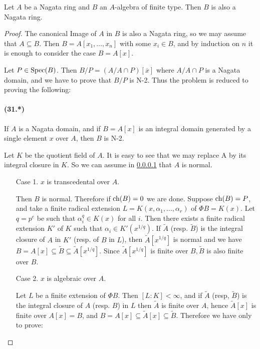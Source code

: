 \documentclass[../main]{subfiles}
\begin{document}
\begin{partheorem}[Nagata]\label{thm:072}
Let $A$ be a Nagata ring and $B$ an $A$-algebra of finite type. Then $B$ is also a Nagata ring.
\end{partheorem} 
\begin{proof}
The canonical Image of $A$ in $B$ is also a Nagata ring, so we may assume that $A \subseteq B$. Then $B=A[x_{1}, \ldots, x_{n}]$ with some $x_{i} \in B$, and by induction on $n$ it is enough to consider the case $B=A[x]$.


Let $P \in \operatorname{Spec}(B)$. Then $B / P=(A / A \cap P)[\overline{x}]$ where $A / A \cap P$ is a Nagata domain, and we have to prove that $B / P$ is N-2.
Thus the problem is reduced to proving the following:

\paragraph{(31.*)}\label{31.*} If $A$ is a Nagata domain, and if $B=A[x]$ is an integral domain generated by a single element $x$ over $A$, then $B$ is N-2.

Let $K$ be the quotient field of $A$. It is easy to see that we may replace A by its integral closure in $K$. So we can assume in \ref{31.*} that $A$ is normal.
\begin{enumerate}
    \item[Case 1.] $x$ is transcedental over $A$.

Then $B$ is normal. Therefore if $\operatorname{ch}(B)=0$ we are done.
Suppose $\operatorname{ch}(B)=P$, and take a finite radical extension $L= K(x, \alpha_{1}, \ldots, \alpha_{r})$ of $\Phi B=K(x)$. Let $q=p^{e}$ be such that $\alpha_{i}^{q} \in K(x)$ for all $i$. Then there exists a finite radical extension $K'$ of $K$ such that $\alpha_{i} \in K'(x^{1 / q})$. If $\widetilde{A}$ (resp. $\widetilde{B}$) is the integral closure of $A$ in $K'$ (resp. of $B$ in $L$), then $\widetilde{A}[x^{1 / q}]$ is normal and we have $B=A[x] \subseteq \widetilde{B} \subseteq \widetilde{A}[x^{1 / q}]$. Since $\widetilde{A}[x^{1 / q}]$ is finite over $B, \widetilde{B}$ is also finite over $B$.

 \item[Case 2.] $x$ is algebraic over $A$.

Let $L$ be a finite extension of $\Phi B$. Then $[L: K]<\infty$, and if $\widetilde{A}$ (resp, $\widetilde{B}$) is the integral closure of $A$ (resp. $B$) in $L$ then $\widetilde{A}$ is finite over $A$, hence $\widetilde{A}[x]$ is finite over $A[x]=B$, and $B=A[x] \subseteq \widetilde{A}[x] \subseteq \widetilde{B}$. Therefore we have only to prove:

\end{enumerate}
\end{proof}
\end{document}
